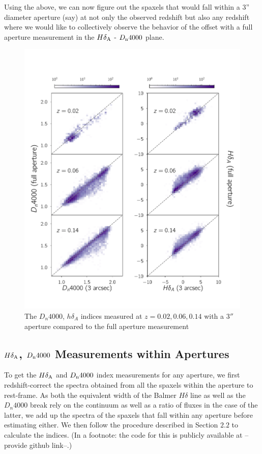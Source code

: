 Using the above, we can now figure out the spaxels that would fall within a 3'' diameter aperture (say) at not only the observed redshift but also any redshift where we would like to collectively observe the behavior of the offset with a full aperture measurement in the $H\delta_{\rm A}$ - $D_{\rm n}4000$ plane.


\begin{figure}
\includegraphics[width=\textwidth]{figures/full_aperture_comparisons.pdf}
\caption[Short figure name.]{ The $D_{n}4000$, $h\delta_{A}$ indices measured at $z = 0.02,0.06,0.14$ with a $3''$ aperture compared to the full aperture measurement
\label{fig:redshift_comparison}}
\end{figure}


\subsection{$H\delta_{\rm A}$, $D_{\rm n}4000$ Measurements within Apertures}
To get the $H\delta_{\rm A}$ and $D_{\rm n}4000$ index measurements for any aperture, we first redshift-correct the spectra obtained from all the spaxels within the aperture to rest-frame. As both the equivalent width of the Balmer $H\delta$ line as well as the $D_{n}4000$ break rely on the continuum as well as a ratio of fluxes in the case of the latter, we add up the spectra of the spaxels that fall within any aperture before estimating either. We then follow the procedure described in Section $2.2$ to calculate the indices. (In a footnote: the code for this is publicly available at --provide github link--.)


